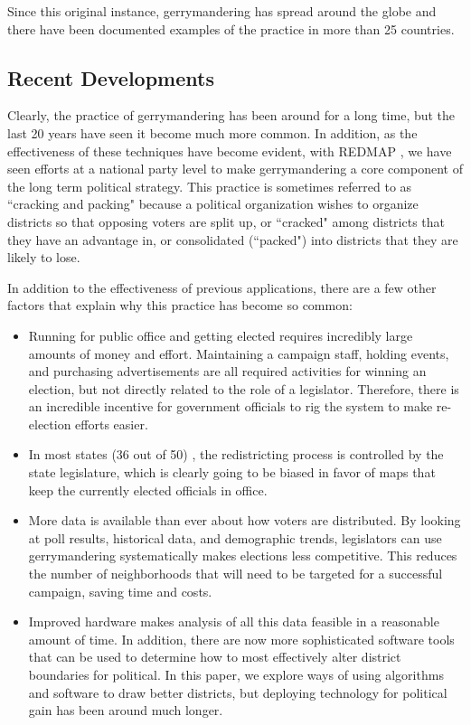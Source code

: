 \documentclass[11pt]{article}
\begin{document}
Since this original instance, gerrymandering has spread around the globe and there have been documented examples of the practice in more than 25 countries\cite{GerrymanderingWiki}.

\subsection{Recent Developments}

Clearly, the practice of gerrymandering has been around for a long time, but the last 20 years have seen it become much more common. In addition, as the effectiveness of these techniques have become evident, with REDMAP \cite{RedmapWiki}, we have seen efforts at a national party level to make gerrymandering a core component of the long term political strategy. This practice is sometimes referred to as ``cracking and packing" because a political organization wishes to organize districts so that opposing voters are split up, or ``cracked" among districts that they have an advantage in, or consolidated (``packed") into districts that they are likely to lose.

In addition to the effectiveness of previous applications, there are a few other factors that explain why this practice has become so common:
\begin{itemize}
	\item Running for public office and getting elected requires incredibly large amounts of money and effort. Maintaining a campaign staff, holding events, and purchasing advertisements are all required activities for winning an election, but not directly related to the role of a legislator. Therefore, there is an incredible incentive for government officials to rig the system to make re-election efforts easier.
	\item In most states (36 out of 50) \cite{GerrymanderingWiki}, the redistricting process is controlled by the state legislature, which is clearly going to be biased in favor of maps that keep the currently elected officials in office.
	\item More data is available than ever about how voters are distributed. By looking at poll results, historical data, and demographic trends, legislators can use gerrymandering systematically makes elections less competitive. This reduces the number of neighborhoods that will need to be targeted for a successful campaign, saving time and costs.
	\item Improved hardware makes analysis of all this data feasible in a reasonable amount of time. In addition, there are now more sophisticated software tools that can be used to determine how to most effectively alter district boundaries for political. In this paper, we explore ways of using algorithms and software to draw better districts, but deploying technology for political gain has been around much longer.
\end{itemize}
\end{document}
